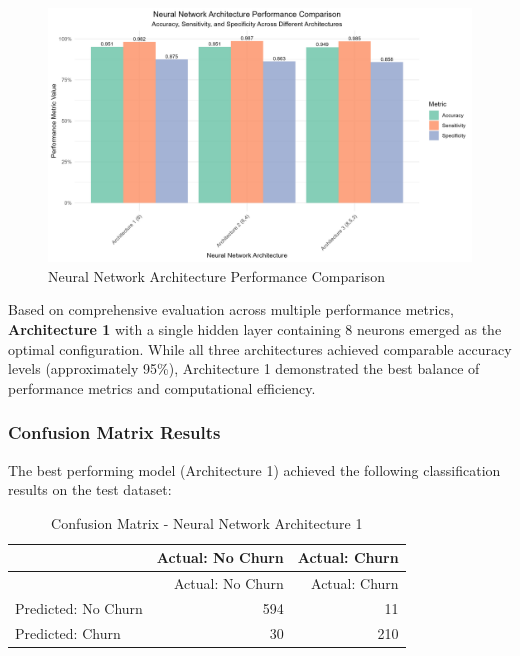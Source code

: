 \documentclass[
]{article}
\begin{document}
\begin{figure}

{\centering \includegraphics[width=0.85\linewidth]{Plots/nn_performance_comparison} 

}

\caption{Neural Network Architecture Performance Comparison}\label{fig:nn-performance-comparison}
\end{figure}

Based on comprehensive evaluation across multiple performance metrics,
\textbf{Architecture 1} with a single hidden layer containing 8 neurons
emerged as the optimal configuration. While all three architectures
achieved comparable accuracy levels (approximately 95\%), Architecture 1
demonstrated the best balance of performance metrics and computational
efficiency.

\hypertarget{confusion-matrix-results}{%
\subsubsection{Confusion Matrix
Results}\label{confusion-matrix-results}}

The best performing model (Architecture 1) achieved the following
classification results on the test dataset:

\begin{longtable}[]{@{}lrr@{}}
\caption{Confusion Matrix - Neural Network Architecture
1}\tabularnewline
\toprule\noalign{}
& Actual: No Churn & Actual: Churn \\
\midrule\noalign{}
\endfirsthead
\toprule\noalign{}
& Actual: No Churn & Actual: Churn \\
\midrule\noalign{}
\endhead
\bottomrule\noalign{}
\endlastfoot
Predicted: No Churn & 594 & 11 \\
Predicted: Churn & 30 & 210 \\
\end{longtable}
\end{document}

